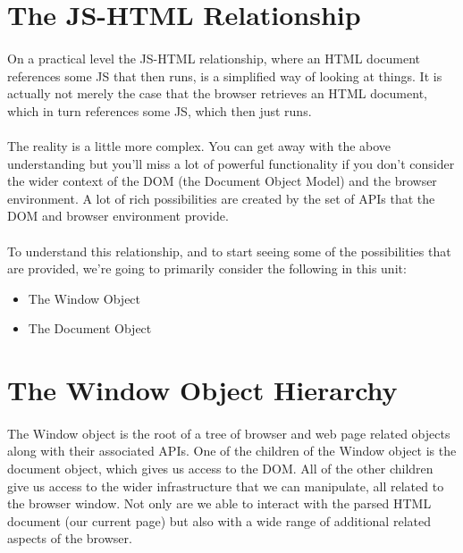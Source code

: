 \section{The JS-HTML Relationship}
\paragraph{} On a practical level the JS-HTML relationship, where an HTML document references some JS that then runs, is a simplified way of looking at things. It is actually not merely the case that the browser retrieves an HTML document, which in turn references some JS, which then just runs.
\paragraph{} The reality is a little more complex. You can get away with the above understanding but you’ll miss a lot of powerful functionality if you don’t consider the wider context of the DOM (the Document Object Model) and the browser environment. A lot of rich possibilities are created by the set of APIs that the DOM and browser environment provide.
\paragraph{} To understand this relationship, and to start seeing some of the possibilities that are provided, we’re going to primarily consider the following in this unit:

\begin{itemize}
\item The Window Object
\item The Document Object
\end{itemize}



\section{The Window Object Hierarchy}
\paragraph{} The Window object is the root of a tree of browser and web page related objects along with their associated APIs. One of the children of the Window object is the document object, which gives us access to the DOM. All of the other children give us access to the wider infrastructure that we can manipulate, all related to the browser window. Not only are we able to interact with the parsed HTML document (our current page) but also with a wide range of additional related aspects of the browser. 
